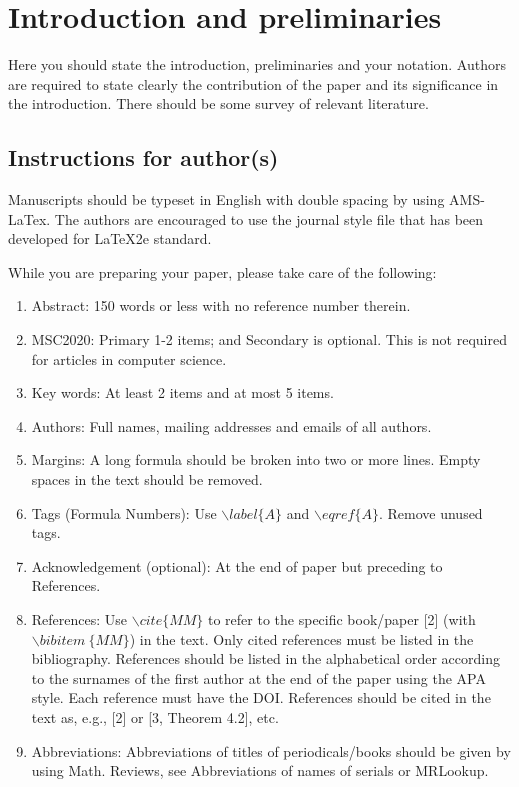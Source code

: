 \documentclass[12pt, reqno]{amsart}
\theoremstyle{definition}
\theoremstyle{remark}
\numberwithin{equation}{section}
\begin{document}

\section{Introduction and preliminaries}

\noindent Here you should state the introduction, preliminaries and
your notation. Authors are required to state clearly the
contribution of the paper and its significance in the introduction.
There should be some survey of relevant literature.

\subsection{Instructions for author(s)}

Manuscripts should be typeset in English with double spacing by
using AMS-LaTex. The authors are encouraged to use the journal style
file that has been developed for LaTeX2e standard.

While you are preparing your paper, please take care of the
following:
\begin{enumerate}
\item Abstract: 150 words or less with no reference number therein.\
\item MSC2020: Primary 1-2 items; and Secondary is optional. This is not required for articles in computer science.\

\item Key words: At least 2 items and at most 5 items.\
\item Authors: Full names, mailing addresses and emails of all authors.\
\item Margins: A long formula should be broken into two or more lines. Empty spaces in the text should be removed.\
\item Tags (Formula Numbers): Use $\backslash label\{A\}$ and $\backslash eqref\{A\}$. Remove unused tags. \
\item Acknowledgement (optional): At the end of paper but preceding to References.\
\item References: Use $\backslash cite\{MM\}$ to refer to the specific book/paper [2] (with $\backslash bibitem~\{MM\}$) in the text. Only cited references must be listed in the bibliography. References should be listed in the alphabetical order according to the surnames of the first author at the end of the paper using the APA style. Each reference must have the DOI.
References should be cited in the text as, e.g., [2] or [3, Theorem 4.2], etc.  \
\item Abbreviations: Abbreviations of titles of periodicals/books should be given by using Math. Reviews, see Abbreviations of names of serials or MRLookup.

\end{enumerate}
\end{document}
